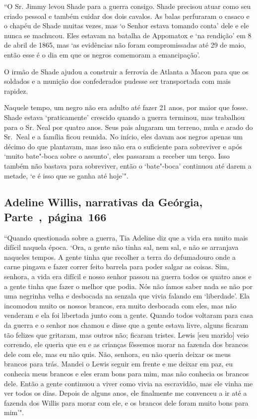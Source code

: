 ``O Sr. Jimmy levou Shade para a guerra consigo. Shade precisou atuar
como seu criado pessoal e também cuidar dos dois cavalos. As balas
perfuraram o casaco e o chapéu de Shade muitas vezes, mas `o Senhor
estava tomando conta' dele e ele nunca se machucou. Eles estavam na
batalha de Appomatox e `na rendição' em 8 de abril de 1865, mas `as
evidências não foram compromissadas até 29 de maio, então esse é o dia
em que os negros comemoram a emancipação'.

O irmão de Shade ajudou a construir a ferrovia de Atlanta a Macon para
que os soldados e a munição dos confederados pudesse ser transportada
com mais rapidez.

Naquele tempo, um negro não era adulto até fazer 21 anos, por maior que
fosse. Shade estava `praticamente' crescido quando a guerra terminou,
mas trabalhou para o Sr. Neal por quatro anos. Seus pais alugaram um
terreno, mula e arado do Sr.~Neal e a família ficou reunida. No início,
eles davam aos negros apenas um décimo do que plantavam, mas isso não
era o suficiente para sobreviver e após `muito bate"-boca sobre o
assunto', eles passaram a receber um terço. Isso também não bastava para
sobreviver, então o `bate"-boca' continuou até darem a metade, `e é isso
que se ganha até hoje'".

\subsection{Adeline Willis, narrativas da Geórgia, Parte~,~página~166}
\label{ref299}

``Quando questionada sobre a guerra, Tia Adeline diz que a vida era
muito mais difícil naquela época. `Ora, a gente não tinha sal, nem sal, %
e não se arranjava naqueles tempos. A gente tinha que recolher a terra
do defumadouro onde a carne pingava e fazer correr feito barrela para
poder salgar as coisas. Sim, senhora, a vida era difícil e nosso senhor
passou na guerra todos os quatro anos e a gente tinha que fazer o melhor
que podia. Nós não íamos saber nada se não por uma negrinha velha e
desbocada na senzala que vivia falando em `liberdade'. Ela incomodou
muito os nossos brancos, era muito desbocada com eles, mas não venderam
e ela foi libertada junto com a gente. Quando todos voltaram para casa
da guerra e o senhor nos chamou e disse que a gente estava livre, alguns
ficaram tão felizes que gritaram, mas outros não; ficaram tristes. Lewis
{[}seu marido{]} veio correndo, ele queria que eu e as crianças fôssemos
morar na fazenda dos brancos dele com ele, mas eu não quis. Não,
senhora, eu não queria deixar os meus brancos para trás. Mandei o Lewis
seguir em frente e me deixar em paz, eu conhecia meus brancos e eles
eram bons para mim, mas não conhecia os brancos dele. Então a gente
continuou a viver como vivia na escravidão, mas ele vinha me ver todos
os dias. Depois de alguns anos, ele finalmente me convenceu a ir até a
fazenda dos Willis para morar com ele, e os brancos dele foram muito
bons para mim'".


